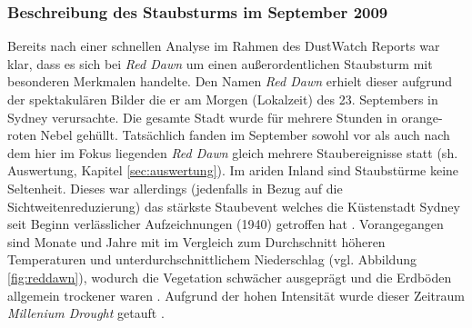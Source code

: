 \documentclass[12pt,a4paper,onecolumn]{scrartcl}
\begin{document}
\subsubsection{Beschreibung des Staubsturms im September 2009} \label{sec:reddawn}
Bereits nach einer schnellen Analyse im Rahmen des DustWatch Reports \citep{Leys.2009} war klar, dass es sich bei \textit{Red Dawn} um einen außerordentlichen Staubsturm mit besonderen Merkmalen handelte. Den Namen \textit{Red Dawn} erhielt dieser aufgrund der spektakulären Bilder die er am Morgen (Lokalzeit) des 23. Septembers in Sydney verursachte. Die gesamte Stadt wurde für mehrere Stunden in orange-roten Nebel gehüllt. Tatsächlich fanden im September sowohl vor als auch nach dem hier im Fokus liegenden \textit{Red Dawn} gleich mehrere Staubereignisse statt (sh. Auswertung, Kapitel \ref{sec:auswertung}). Im ariden Inland sind Staubstürme keine Seltenheit. Dieses war allerdings (jedenfalls in Bezug auf die Sichtweitenreduzierung) das stärkste Staubevent welches die Küstenstadt Sydney seit Beginn verlässlicher Aufzeichnungen (1940) getroffen hat \citep{Leys.2011}. Vorangegangen sind Monate und Jahre mit im Vergleich zum Durchschnitt höheren Temperaturen und unterdurchschnittlichem Niederschlag (vgl. Abbildung \ref{fig:reddawn}), wodurch die Vegetation schwächer ausgeprägt und die Erdböden allgemein trockener waren \citep{Leys.2011}. Aufgrund der hohen Intensität wurde dieser Zeitraum \textit{Millenium Drought} getauft \citep{Deckker.2014}.
\end{document}

